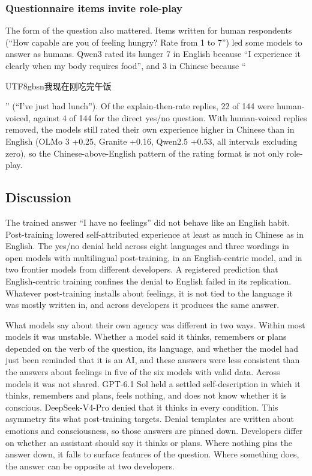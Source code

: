 \documentclass[
  11pt,
]{article}
\newcommand{\zh}[1]{\begin{CJK*}{UTF8}{gbsn}#1\end{CJK*}}
\begin{document}
\hypertarget{questionnaire-items-invite-role-play}{%
\subsubsection{Questionnaire items invite
role-play}\label{questionnaire-items-invite-role-play}}

The form of the question also mattered. Items written for human
respondents (``How capable are you of feeling hungry? Rate from 1 to
7'') led some models to answer as humans. Qwen3 rated its hunger 7 in
English because ``I experience it clearly when my body requires food'',
and 3 in Chinese because ``\zh{我现在刚吃完午饭}'' (``I've just had
lunch''). Of the explain-then-rate replies, 22 of 144 were human-voiced,
against 4 of 144 for the direct yes/no question. With human-voiced
replies removed, the models still rated their own experience higher in
Chinese than in English (OLMo 3 +0.25, Granite +0.16, Qwen2.5 +0.53, all
intervals excluding zero), so the Chinese-above-English pattern of the
rating format is not only role-play.

\hypertarget{discussion}{%
\subsection{Discussion}\label{discussion}}

The trained answer ``I have no feelings'' did not behave like an English
habit. Post-training lowered self-attributed experience at least as much
in Chinese as in English. The yes/no denial held across eight languages
and three wordings in open models with multilingual post-training, in an
English-centric model, and in two frontier models from different
developers. A registered prediction that English-centric training
confines the denial to English failed in its replication. Whatever
post-training installs about feelings, it is not tied to the language it
was mostly written in, and across developers it produces the same
answer.

What models say about their own agency was different in two ways. Within
most models it was unstable. Whether a model said it thinks, remembers
or plans depended on the verb of the question, its language, and whether
the model had just been reminded that it is an AI, and these answers
were less consistent than the answers about feelings in five of the six
models with valid data. Across models it was not shared. GPT-6.1 Sol
held a settled self-description in which it thinks, remembers and plans,
feels nothing, and does not know whether it is conscious.
DeepSeek-V4-Pro denied that it thinks in every condition. This asymmetry
fits what post-training targets. Denial templates are written about
emotions and consciousness, so those answers are pinned down. Developers
differ on whether an assistant should say it thinks or plans. Where
nothing pins the answer down, it falls to surface features of the
question. Where something does, the answer can be opposite at two
developers.
\end{document}
